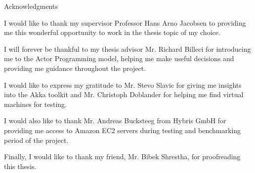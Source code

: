 \thispagestyle{empty}

\vspace*{2cm}

\begin{center}
{ Acknowledgments}
\end{center}

\vspace{1cm}

  I would like to thank my supervisor Professor Hans Arno Jacobsen to providing me this wonderful opportunity to work in the thesis topic of my choice.

  I will forever be thankful to my thesis advisor Mr. Richard Billeci for introducing me to the Actor Programming model, helping me make useful decisions and providing me guidance throughout the project.

  I would like to express my gratitude to Mr. Stevo Slavic for giving me insights into the Akka toolkit and Mr. Christoph Doblander for helping me find virtual machines for testing.

  I would also like to thank Mr. Andreas Bucksteeg from Hybris GmbH for providing me access to Amazon EC2 servers during testing and benchmarking period of the project.

  Finally, I would like to thank my friend, Mr. Bibek Shrestha, for proofreading this thesis.

\cleardoublepage{}
